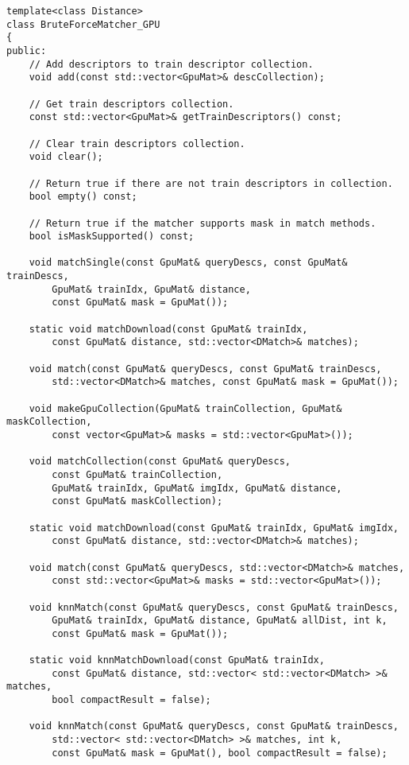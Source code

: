 \begin{lstlisting}
template<class Distance>
class BruteForceMatcher_GPU
{
public:
    // Add descriptors to train descriptor collection.
    void add(const std::vector<GpuMat>& descCollection);

    // Get train descriptors collection.
    const std::vector<GpuMat>& getTrainDescriptors() const;

    // Clear train descriptors collection.
    void clear();

    // Return true if there are not train descriptors in collection.
    bool empty() const;

    // Return true if the matcher supports mask in match methods.
    bool isMaskSupported() const;

    void matchSingle(const GpuMat& queryDescs, const GpuMat& trainDescs,
        GpuMat& trainIdx, GpuMat& distance,
        const GpuMat& mask = GpuMat());

    static void matchDownload(const GpuMat& trainIdx, 
        const GpuMat& distance, std::vector<DMatch>& matches);

    void match(const GpuMat& queryDescs, const GpuMat& trainDescs, 
        std::vector<DMatch>& matches, const GpuMat& mask = GpuMat());

    void makeGpuCollection(GpuMat& trainCollection, GpuMat& maskCollection,
        const vector<GpuMat>& masks = std::vector<GpuMat>());

    void matchCollection(const GpuMat& queryDescs, 
        const GpuMat& trainCollection,
        GpuMat& trainIdx, GpuMat& imgIdx, GpuMat& distance,
        const GpuMat& maskCollection);

    static void matchDownload(const GpuMat& trainIdx, GpuMat& imgIdx, 
        const GpuMat& distance, std::vector<DMatch>& matches);

    void match(const GpuMat& queryDescs, std::vector<DMatch>& matches,
        const std::vector<GpuMat>& masks = std::vector<GpuMat>());

    void knnMatch(const GpuMat& queryDescs, const GpuMat& trainDescs,
        GpuMat& trainIdx, GpuMat& distance, GpuMat& allDist, int k, 
        const GpuMat& mask = GpuMat());

    static void knnMatchDownload(const GpuMat& trainIdx, 
        const GpuMat& distance, std::vector< std::vector<DMatch> >& matches, 
        bool compactResult = false);

    void knnMatch(const GpuMat& queryDescs, const GpuMat& trainDescs,
        std::vector< std::vector<DMatch> >& matches, int k, 
        const GpuMat& mask = GpuMat(), bool compactResult = false);
        

\end{lstlisting}
